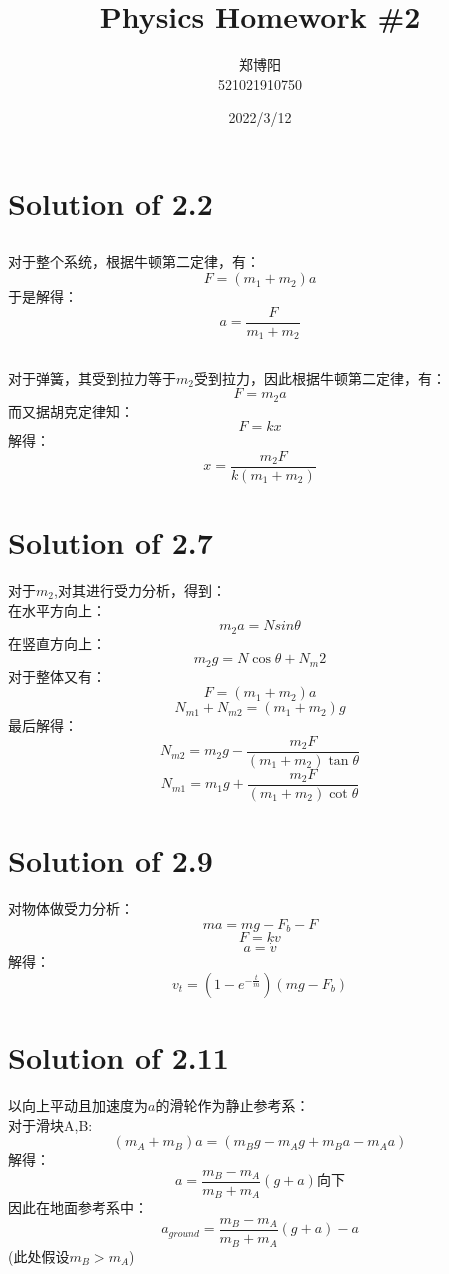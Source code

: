 \documentclass[UTF8]{ctexart}
\title{Physics Homework \#2\\}
\author{郑博阳\\521021910750}
\date{2022/3/12}
\begin{document}
\maketitle
\tableofcontents
\newpage
\section{Solution of 2.2}
\subsection{}
\newcommand\degree{^\circ}
对于整个系统，根据牛顿第二定律，有：
        \[F=(m_1+m_2)a\]
    \qquad 于是解得：
        \[a=\frac{F}{m_1+m_2}\]
\subsection{}
对于弹簧，其受到拉力等于$m_2$受到拉力，因此根据牛顿第二定律，有：
        \[F=m_2a\]
    \qquad 而又据胡克定律知：
        \[F=kx\]
    \qquad 解得：
        \[x=\frac{m_2F}{k(m_1+m_2)}\]
\section{Solution of 2.7}
 对于$ m_2 $,对其进行受力分析，得到：\\
\qquad 在水平方向上：
        \[m_2a=Nsin{\theta}\]
\qquad 在竖直方向上：
        \[m_2g=N\cos{\theta}+N_m2\]
\qquad 对于整体又有：
        \[F=(m_1+m_2)a\]
        \[N_{m1}+N_{m2}=(m_1+m_2)g\]
        \qquad 最后解得：
        \[N_{m2}=m_2g-\frac{m_2F}{(m_1+m_2)\tan{\theta}}\]
        \[N_{m1}=m_1g+\frac{m_2F}{(m_1+m_2)\cot{\theta}}\]
\section{Solution of 2.9}
\qquad 对物体做受力分析：
        \[ma=mg-F_b-F\]
        \[F=kv\]
        \[a=\dot v\]
\qquad        解得：
\large
        \[v_t=(1-e^{-\frac{t}{m}})(mg-F_b)\]
\normalsize
\section{Solution of 2.11}
 以向上平动且加速度为$a$的滑轮作为静止参考系：
\\ \hspace{5cm} 对于滑块A,B:
        \[(m_A+m_B)a=(m_Bg-m_Ag+m_Ba-m_Aa)\]
\qquad 解得：
        \[a=\frac{m_B-m_A}{m_B+m_A}(g+a) \mbox{向下}\]
\qquad 因此在地面参考系中：
\large
        \[a_{ground}=\frac{m_B-m_A}{m_B+m_A}(g+a)-a\]
\normalsize
        \qquad (此处假设$m_B>m_A$)
\end{document}
